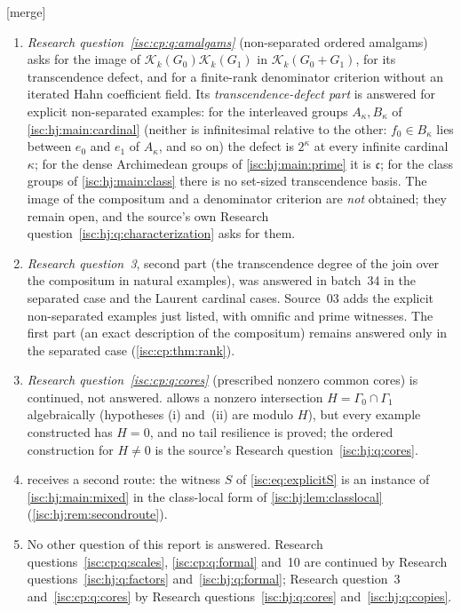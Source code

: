 \documentclass[11pt,letterpaper]{article}
\theoremstyle{definition}
\theoremstyle{remark}
\newcommand{\K}[2]{\mathcal K_{#1}(#2)}
\newcommand{\mtag}{\textup{[merge]}}%
\newcommand{\cc}{\mathfrak c}
\numberwithin{equation}{section}
\begin{document}
\mtag{}
\begin{enumerate}[leftmargin=*,itemsep=3pt]
\item \emph{Research question~\ref{isc:cp:q:amalgams}} (non-separated
ordered amalgams) asks for the image of $\K{k}{G_0}\K{k}{G_1}$ in
$\K{k}{G_0+G_1}$, for its transcendence defect, and for a finite-rank
denominator criterion without an iterated Hahn coefficient field. Its
\emph{transcendence-defect part} is answered for explicit non-separated
examples: for the interleaved groups $A_\kappa,B_\kappa$ of
\cref{isc:hj:main:cardinal} (neither is infinitesimal relative to the
other: $f_0\in B_\kappa$ lies between $e_0$ and $e_1$ of $A_\kappa$, and so on)
the defect is $2^\kappa$ at every infinite cardinal $\kappa$; for the dense
Archimedean groups of \cref{isc:hj:main:prime} it is $\cc$; for the class
groups of \cref{isc:hj:main:class} there is no set-sized transcendence
basis. The image of the compositum and a denominator criterion are
\emph{not} obtained; they remain open, and the source's own
Research question~\ref{isc:hj:q:characterization} asks for them.
\item \emph{Research question~3}, second part (the transcendence degree of
the join over the compositum in natural examples), was answered in
batch~34 in the separated case and the Laurent cardinal cases. Source~03
adds the explicit non-separated examples just listed, with omnific and
prime witnesses. The first part (an exact description of the compositum)
remains answered only in the separated case (\cref{isc:cp:thm:rank}).
\item \emph{Research question~\ref{isc:cp:q:cores}} (prescribed nonzero
common cores) is continued, not answered. 
allows a nonzero intersection $H=\Gamma_0\cap\Gamma_1$ algebraically
(hypotheses (i) and~(ii) are modulo $H$), but every example constructed has
$H=0$, and no tail resilience is proved; the ordered construction for
$H\ne0$ is the source's Research question~\ref{isc:hj:q:cores}.
\item {} receives a second route: the witness $S$ of
\eqref{isc:eq:explicitS} is an instance of \cref{isc:hj:main:mixed} in the
class-local form of \cref{isc:hj:lem:classlocal}
(\cref{isc:hj:rem:secondroute}).
\item No other question of this report is answered. Research
questions~\ref{isc:cp:q:scales}, \ref{isc:cp:q:formal} and~10 are continued
by Research questions~\ref{isc:hj:q:factors} and~\ref{isc:hj:q:formal};
Research question~3 and~\ref{isc:cp:q:cores} by
Research questions~\ref{isc:hj:q:cores} and~\ref{isc:hj:q:copies}.
\end{enumerate}
\end{document}
